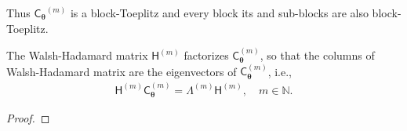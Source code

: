 \documentclass{svjour3}                     %
\newcommand{\bm}[1]{\boldsymbol{#1}}
\newcommand{\naturals}{\mathbb{N}}
\newcommand{\vtheta}{{\bm{\theta}}}
\newcommand{\mC}{\mathsf{C}}
\newcommand{\mCtheta}{{\mathsf{C}_{\vtheta}}}
\newcommand{\mLambda}{\mathsf{\Lambda}}
\newcommand{\mH}{\mathsf{H}}
\begin{document}
\begin{itemize}
	Thus $\mCtheta^{(m)}$ is a block-Toeplitz and every block its and sub-blocks are also block-Toeplitz.
	
	
\end{itemize}
\fi


\begin{theorem}
	\label{thrm:hadamard_eigenvector}
	The Walsh-Hadamard matrix $\mH^{(m)}$ factorizes $\mC_{\vtheta}^{(m)}$, so that the columns of Walsh-Hadamard matrix are the eigenvectors of $\mC_{\vtheta}^{(m)}$, i.e.,
	\begin{align*}
	\mH^{(m)} \mC_{\vtheta}^{(m)}  = \mLambda^{(m)} \mH^{(m)}, \quad m \in \naturals. 
	\end{align*}
\end{theorem}

\begin{proof}
	

\end{proof}
\end{document}
